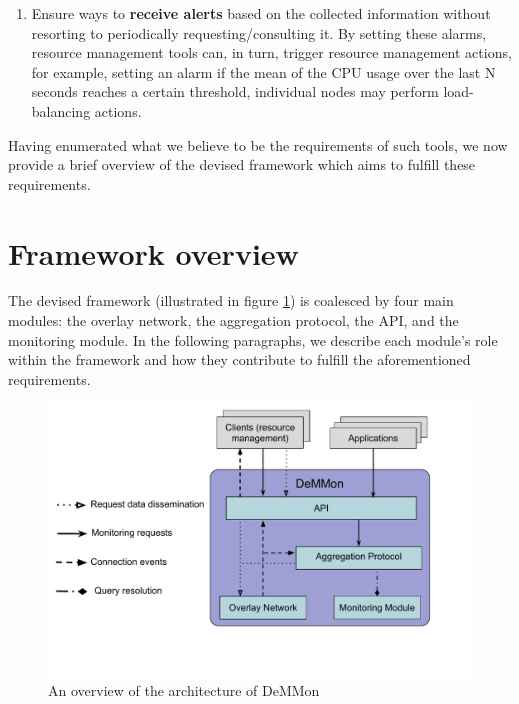 \begin{enumerate}
    \item Ensure ways to \textbf{receive alerts} based on the collected information without resorting to periodically requesting/consulting it. By setting these alarms, resource management tools can, in turn, trigger resource management actions, for example, setting an alarm if the mean of the CPU usage over the last N seconds reaches a certain threshold, individual nodes may perform load-balancing actions. \label{enum:demmon_6}
    
\end{enumerate}

Having enumerated what we believe to be the requirements of such tools, we now provide a brief overview of the devised framework which aims to fulfill these requirements. 

\section{Framework overview}
\label{sec:framework_overview}


The devised framework (illustrated in figure \ref{fig:demmon-overview}) is coalesced by four main modules: the overlay network, the aggregation protocol, the API, and the monitoring module. In the following paragraphs, we describe each module's role within the framework and how they contribute to fulfill the aforementioned requirements.

\begin{figure}[htbp]
    \centering
    \includegraphics[width=\textwidth]{Chapters/Figures/DeMMon-overview.pdf}
    \caption{An overview of the architecture of DeMMon}
    \label{fig:demmon-overview}
\end{figure}
    
